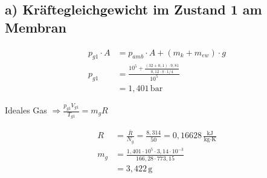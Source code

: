 \subsection*{a) Kräftegleichgewicht im Zustand 1 am Membran}

\begin{align*}
    p_{g1} \cdot A &= p_{amb} \cdot A + (m_k + m_{ew}) \cdot g \\
    p_{g1} &= \frac{10^5 + \frac{(32 + 0,1) \cdot 9,81}{0,12 \cdot \pi \cdot 1/4}}{10^5} \\
    &= 1,401 \, \text{bar}
\end{align*}

Ideales Gas $\Rightarrow \frac{p_{g1} V_{g1}}{T_{g1}} = m_g R$

\begin{align*}
    R &= \frac{\bar{R}}{N_g} = \frac{8,314}{50} = 0,16628 \, \frac{\text{kJ}}{\text{kg} \cdot \text{K}} \\
    m_g &= \frac{1,401 \cdot 10^5 \cdot 3,14 \cdot 10^{-3}}{166,28 \cdot 773,15} \\
    &= 3,422 \, \text{g}
\end{align*}